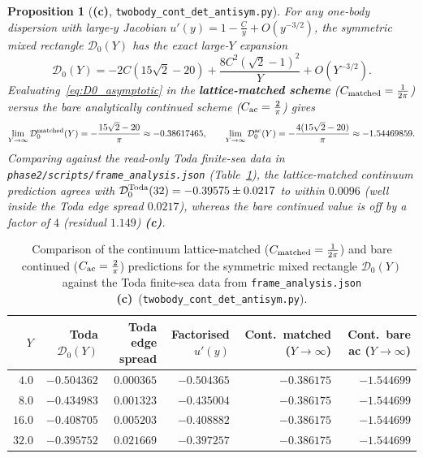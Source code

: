 \documentclass[11pt,a4paper]{article}
\newcommand{\Lc}{\textbf{(c)}}
\newcommand{\script}[1]{\texttt{#1}}
\newtheorem{proposition}{Proposition}[section]
\begin{document}
\begin{proposition}[\Lc, \script{twobody\_cont\_det\_antisym.py}]\label{prop:mixed_rectangle}
For any one-body dispersion with large-$y$ Jacobian $u'(y)=1-\frac{C}{y}+O(y^{-3/2})$, the symmetric mixed rectangle $\mathcal{D}_0(Y)$ has the exact large-$Y$ expansion
\begin{equation}\label{eq:D0_asymptotic}
\mathcal{D}_0(Y)=-2C\left(15\sqrt2-20\right)+\frac{8C^2(\sqrt2-1)^2}{Y}+O(Y^{-3/2}).
\end{equation}
Evaluating~\eqref{eq:D0_asymptotic} in the \textbf{lattice-matched scheme} ($C_{\rm matched}=\frac{1}{2\pi}$) versus the bare analytically continued scheme ($C_{\rm ac}=\frac{2}{\pi}$) gives
\begin{equation}\label{eq:D0_matched_vs_ac}
\lim_{Y\to\infty}\mathcal{D}_0^{\rm matched}(Y)=-\frac{15\sqrt2-20}{\pi}\approx -0.38617465,\qquad
\lim_{Y\to\infty}\mathcal{D}_0^{\rm ac}(Y)=-\frac{4(15\sqrt2-20)}{\pi}\approx -1.54469859.
\end{equation}
Comparing against the read-only Toda finite-sea data in \texttt{phase2/scripts/frame\_analysis.json} (Table~\ref{tab:rectangle_toda}), the lattice-matched continuum prediction agrees with $\mathcal{D}_0^{\rm Toda}(32)=-0.39575\pm 0.0217$ to within $0.0096$ (well inside the Toda edge spread $0.0217$), whereas the bare continued value is off by a factor of $4$ (residual $1.149$) \Lc.
\end{proposition}

\begin{table}[htbp]
\centering
\caption{Comparison of the continuum lattice-matched ($C_{\rm matched}=\frac{1}{2\pi}$) and bare continued ($C_{\rm ac}=\frac{2}{\pi}$) predictions for the symmetric mixed rectangle $\mathcal{D}_0(Y)$ against the Toda finite-sea data from \texttt{frame\_analysis.json} \Lc\ (\script{twobody\_cont\_det\_antisym.py}).}
\label{tab:rectangle_toda}
\medskip
\begin{tabular}{@{}rrrrrr@{}}
\toprule
$Y$ & Toda $\mathcal{D}_0(Y)$ & Toda edge spread & Factorised $u'(y)$ & Cont.\ matched ($Y\to\infty$) & Cont.\ bare ac ($Y\to\infty$) \\
\midrule
$4.0$  & $-0.504362$ & $0.000365$ & $-0.504365$ & $-0.386175$ & $-1.544699$ \\
$8.0$  & $-0.434983$ & $0.001323$ & $-0.435004$ & $-0.386175$ & $-1.544699$ \\
$16.0$ & $-0.408705$ & $0.005203$ & $-0.408882$ & $-0.386175$ & $-1.544699$ \\
$32.0$ & $-0.395752$ & $0.021669$ & $-0.397257$ & $-0.386175$ & $-1.544699$ \\
\bottomrule
\end{tabular}
\end{table}
\end{document}
